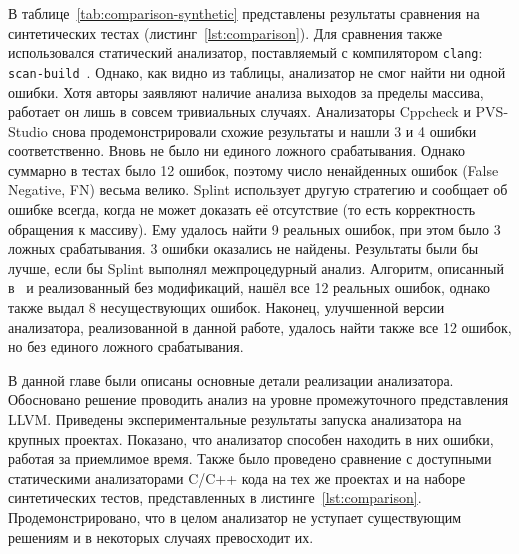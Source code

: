 В таблице~\ref{tab:comparison-synthetic} представлены результаты
сравнения на синтетических тестах (листинг~\ref{lst:comparison}). Для
сравнения также использовался статический анализатор, поставляемый с
компилятором \texttt{clang}:
\texttt{scan-build}~\cite{scan-build}. Однако, как видно из таблицы,
анализатор не смог найти ни одной ошибки. Хотя авторы заявляют наличие
анализа выходов за пределы массива, работает он лишь в совсем
тривиальных случаях. Анализаторы Cppcheck и PVS-Studio снова
продемонстрировали схожие результаты и нашли 3 и 4 ошибки
соответственно. Вновь не было ни единого ложного срабатывания. Однако
суммарно в тестах было 12 ошибок, поэтому число ненайденных ошибок
(False Negative, FN) весьма велико. Splint использует другую стратегию
и сообщает об ошибке всегда, когда не может доказать её отсутствие (то
есть корректность обращения к массиву). Ему удалось найти 9 реальных
ошибок, при этом было 3 ложных срабатывания. 3 ошибки оказались не
найдены. Результаты были бы лучше, если бы Splint выполнял
межпроцедурный анализ. Алгоритм, описанный в~\cite{li2010practical} и
реализованный без модификаций, нашёл все 12 реальных ошибок, однако
также выдал 8 несуществующих ошибок. Наконец, улучшенной версии
анализатора, реализованной в данной работе, удалось найти также все 12
ошибок, но без единого ложного срабатывания.

\chapterconclusion

В данной главе были описаны основные детали реализации
анализатора. Обосновано решение проводить анализ на уровне
промежуточного представления LLVM.  Приведены экспериментальные
результаты запуска анализатора на крупных проектах. Показано, что
анализатор способен находить в них ошибки, работая за приемлимое
время. Также было проведено сравнение с доступными статическими
анализаторами C/C++ кода на тех же проектах и на наборе синтетических
тестов, представленных в
листинге~\ref{lst:comparison}. Продемонстрировано, что в целом
анализатор не уступает существующим решениям и в некоторых случаях
превосходит их.
